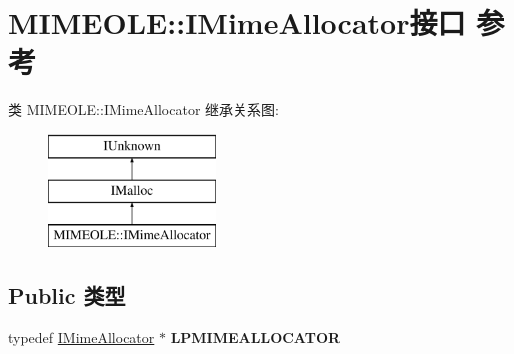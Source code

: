 \hypertarget{interface_m_i_m_e_o_l_e_1_1_i_mime_allocator}{}\section{M\+I\+M\+E\+O\+LE\+:\+:I\+Mime\+Allocator接口 参考}
\label{interface_m_i_m_e_o_l_e_1_1_i_mime_allocator}
类 M\+I\+M\+E\+O\+LE\+:\+:I\+Mime\+Allocator 继承关系图\+:\begin{figure}[H]
\begin{center}
\leavevmode
\includegraphics[height=3.000000cm]{interface_m_i_m_e_o_l_e_1_1_i_mime_allocator}
\end{center}
\end{figure}
\subsection*{Public 类型}
\begin{DoxyCompactItemize}
\item 
\mbox{\label{interface_m_i_m_e_o_l_e_1_1_i_mime_allocator_a6b1546732ee4f209eab128713c2e0535}} 
typedef \hyperlink{interface_m_i_m_e_o_l_e_1_1_i_mime_allocator}{I\+Mime\+Allocator} $\ast$ {\bfseries L\+P\+M\+I\+M\+E\+A\+L\+L\+O\+C\+A\+T\+OR}
\end{DoxyCompactItemize}
